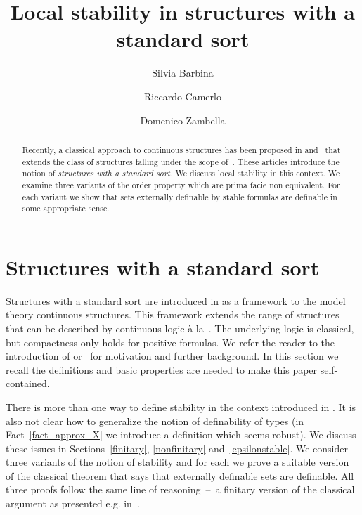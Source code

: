 \documentclass{amsproc}
\author{Silvia Barbina}
\author{Riccardo Camerlo}
\author{Domenico Zambella}
\theoremstyle{mio}
\begin{document}
\vspace*{-1ex}
\title{Local stability in structures with a standard sort}
\maketitle
\raggedbottom

\begin{abstract}
  Recently, a classical approach to continuous structures has been proposed in \cite{clcl} and~\cite{Z} that extends the class of structures falling under the scope of~\cite{BBHU}.
  These articles introduce the notion of \textit{structures with a standard sort.}
  We discuss local stability in this context.
  We examine three variants of the order property which are prima facie non equivalent.
  For each variant we show that sets externally definable by stable formulas are definable in some appropriate sense.
\end{abstract}

\def\medrel#1{\parbox{6ex}{\hfil $#1$}}
\def\ceq#1#2#3{\parbox[t]{13ex}{$\displaystyle #1$}\medrel{#2}{$\displaystyle #3$}}

\section{Structures with a standard sort}

Structures with a standard sort are introduced in \cite{clcl} as a framework to the model theory continuous structures.
This framework extends the range of structures that can be described by continuous logic \`a la~\cite{BBHU}.
The underlying logic is classical, but compactness only holds for positive formulas.
We refer the reader to the introduction of \cite{clcl} or~\cite{Z} for motivation and further background.
In this section we recall the definitions and basic properties are needed to make this paper self-contained.

There is more than one way to define stability in the context introduced in \cite{clcl}.
It is also not clear how to generalize the notion of definability of types (in Fact~\ref{fact_approx_X} we introduce a definition which seems robust).
We discuss these issues in Sections~\ref{finitary}, \ref{nonfinitary} and~\ref{epsilonstable}.
We consider three variants of the notion of stability and for each we prove a suitable version of the classical theorem that says that externally definable sets are definable.
All three proofs follow the same line of reasoning~--~a finitary version of the classical argument as presented e.g. in~\cite{Z?}.
\end{document}
